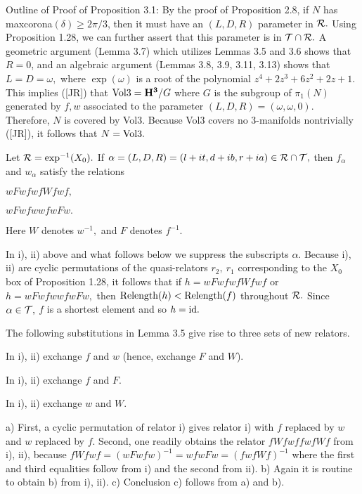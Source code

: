 Outline of Proof of Proposition 3.1: By the proof of Proposition 2.8, if $N$ has maxcorona$(\delta) \ge 2\pi/3$, then it must have an $(L,D,R)$ parameter in
${\cal R}.$   Using Proposition 1.28, we can further assert that this parameter
is in ${\cal T} \cap {\cal R}.$   
A geometric argument (Lemma 3.7) which utilizes Lemmas 3.5 and 3.6 shows that $R = 0$, and an algebraic argument (Lemmas 3.8, 3.9, 3.11, 3.13) shows that $L = D = \omega,$ where $\exp(\omega)$ is a root of the polynomial $z^4 + 2z^3 + 6z^2 + 2z + 1.$  This implies ([JR]) that ${\rm Vol3} = {\bf H^3}/G$ where $G$ is the subgroup of $\pi_1(N)$ generated by $f,w$ associated to the parameter $(L, D, R) = (\omega, \omega, 0).$ Therefore, $N$ is covered by Vol3.  Because Vol3 covers no 3-manifolds nontrivially ([JR]), it follows that $N = {\rm Vol3}.$
\enddemo

\hskip-8pt  Let ${\cal R} = \exp^{-1}(X_0).$ If
$\alpha= (L,D,R)=(l+it, d+ib, r+ia)  \in {\cal R} \cap {\cal T},$ then $f_\alpha$ and 
$w_\alpha$ satisfy the relations
\begin{itemize}
  $wFwfwfWfwf,$

 $wFwfwwfwFw.$
\end{itemize}
\noindent Here $W$ denotes $w^{-1},$ and $F$ denotes $f^{-1}$. 
\endproclaim

  In i), ii) above and what follows below we suppress the subscripts
$\alpha.$   Because i), ii) are cyclic permutations of the quasi-relators $r_2,\ r_1$ corresponding to the $X_0$ box of Proposition 1.28, it follows that if 
$h=wFwfwfWfwf$     or $h=wFwfwwfwFw,$ then ${\rm Relength}(h) < {\rm Relength}(f)$ throughout ${\cal R}.$  Since
$\alpha\in {\cal T},$  $f$ is a
shortest element and so $h={\rm id}.$  \enddemo

  The following substitutions in Lemma {\rm 3.5}
 give rise to three sets of new relators.
\begin{itemize}
 In {\rm i), ii)} exchange $f$ and $w$  {\rm (}\/hence{\rm ,} exchange $F$ and $W${\rm ).}

 In {\rm i), ii)} exchange $f$ and $F$.

 In {\rm i), ii)} exchange $w$ and $W$.
\end{itemize}

\endproclaim

a)  First, a cyclic permutation of relator i) gives relator i) with $f$
replaced by
$w$ and $w$ replaced by $f$.  Second, one readily obtains the relator $fWfwffwfWf$ from i), ii), because $fWfwf = (wFwfw)^{-1} = wfwFw = (fwfWf)^{-1}$ where the first and third equalities follow from i) and the second from ii).
b)  Again it is routine to obtain b) from i), ii).
c)  Conclusion c) follows from a) and b). \enddemo


